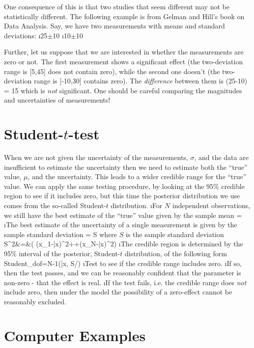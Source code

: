 One consequence of this is that two studies that seem different may not be statistically different.  The following example is from Gelman and Hill's book on Data Analysis.\cite{gelman2007data} Say, we have two measurements with means and standard deviations:
\bi
\i 25$\pm$10
\i 10$\pm$10
\ei

Further, let us suppose that we are interested in whether the measurements are zero or not.  The first measurement shows a significant effect (the two-deviation range is [5,45] does not contain zero), while the second one doesn't (the two-deviation range is [-10,30] contains zero).  The {\em difference} between them is 
\beqn
(25-10) \pm {} = 15
\eeqn
which is {\em not} significant.  One should be careful comparing the magnitudes and uncertainties of measurements!

\section{Student-$t$-test}\label{sec:ttest}

When we are not given the uncertainty of the measurements, $\sigma$, and the data are insufficient to estimate the uncertainty then we need to estimate both the ``true'' value, $\mu$, and the uncertainty.  This leads to a wider credible range for the ``true'' value.  We can apply the same testing procedure, by looking at the 95\% credible region to see if it includes zero, but this time the posterior distribution we use comes from the so-called Student-$t$ distribution.
\be
\i  For $N$ independent observations, we still have the best estimate of the ``true'' value given by the sample mean
\beqn
\hat{\mu} = 
\eeqn
\i The best estimate of the uncertainty of a single measurement is given by the sample standard deviation
\beqn
\hat{\sigma} = S 
\eeqn
where $S$ is the sample standard deviation
\beqn
S^{2}&=&\left( (x_{1}-\bar{x})^{2}+\cdots+(x_{N}-\bar{x})^{2}\right) 
\eeqn
\i The credible region is determined by the 95\% interval of the posterior, Student-$t$ distribution, of the following form
\beqn
{\rm Student}_{{\rm dof}=N-1}(\bar{x}, S/)
\eeqn
\i Test to see if the credible range includes zero. 
\i If so, then the test passes, and we can be reasonably confident that the parameter is non-zero - that the effect is real. 
\i If the test fails, i.e. the credible range does \emph{not} include zero, then under the model the possibility of a zero-effect cannot be reasonably excluded.
\ee



\section{Computer Examples}
\begin{fullwidth}

\end{fullwidth}